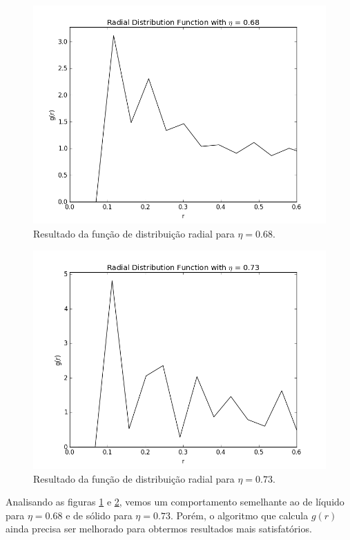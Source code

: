\documentclass[%
reprint,
amsmath,amssymb,
aps,
12pt
]{revtex4-1}
\begin{document}
\begin{figure}[!h]
	\centering
	\includegraphics[scale=0.3]{fdr068.png}
	\caption{Resultado da função de distribuição radial para $ \eta = 0.68 $.
		\label{fdr068}}
\end{figure}
\begin{figure}[!h]
	\centering
	\includegraphics[scale=0.3]{fdr073.png}
	\caption{Resultado da função de distribuição radial para $ \eta = 0.73 $.
		\label{fdr073}}
\end{figure}

Analisando as figuras \ref{fdr068} e \ref{fdr073}, vemos um comportamento semelhante ao de líquido para $ \eta = 0.68 $ e de sólido para $ \eta = 0.73 $. Porém, o algoritmo que calcula $ g(r) $ ainda precisa ser melhorado para obtermos resultados mais satisfatórios.
\end{document}
